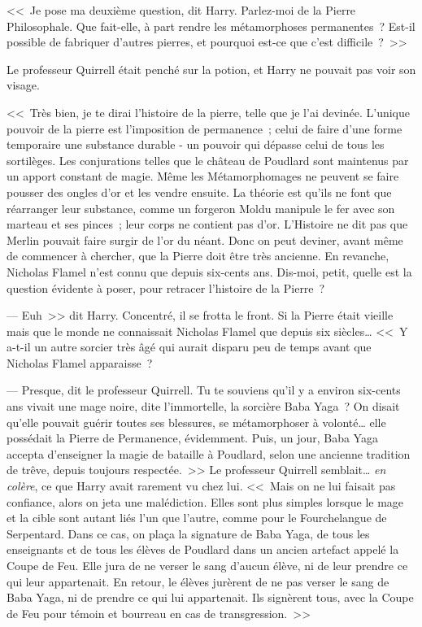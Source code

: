 <<~Je pose ma deuxième question, dit Harry. Parlez-moi de la Pierre Philosophale. Que fait-elle, à part rendre les métamorphoses permanentes~? Est-il possible de fabriquer d'autres pierres, et pourquoi est-ce que c'est difficile~?~>>

Le professeur Quirrell était penché sur la potion, et Harry ne pouvait pas voir son visage.

<<~Très bien, je te dirai l'histoire de la pierre, telle que je l'ai devinée. L'unique pouvoir de la pierre est l'imposition de permanence~; celui de faire d'une forme temporaire une substance durable - un pouvoir qui dépasse celui de tous les sortilèges. Les conjurations telles que le château de Poudlard sont maintenus par un apport constant de magie. Même les Métamorphomages ne peuvent se faire pousser des ongles d'or et les vendre ensuite. La théorie est qu'ils ne font que réarranger leur substance, comme un forgeron Moldu manipule le fer avec son marteau et ses pinces~; leur corps ne contient pas d'or. L'Histoire ne dit pas que Merlin pouvait faire surgir de l'or du néant. Donc on peut deviner, avant même de commencer à chercher, que la Pierre doit être très ancienne. En revanche, Nicholas Flamel n'est connu que depuis six-cents ans. Dis-moi, petit, quelle est la question évidente à poser, pour retracer l'histoire de la Pierre~?

--- Euh~>> dit Harry. Concentré, il se frotta le front. Si la Pierre était vieille mais que le monde ne connaissait Nicholas Flamel que depuis six siècles… <<~Y a-t-il un autre sorcier très âgé qui aurait disparu peu de temps avant que Nicholas Flamel apparaisse~?

--- Presque, dit le professeur Quirrell. Tu te souviens qu'il y a environ six-cents ans vivait une mage noire, dite l'immortelle, la sorcière Baba Yaga~? On disait qu'elle pouvait guérir toutes ses blessures, se métamorphoser à volonté… elle possédait la Pierre de Permanence, évidemment. Puis, un jour, Baba Yaga accepta d'enseigner la magie de bataille à Poudlard, selon une ancienne tradition de trêve, depuis toujours respectée.~>> Le professeur Quirrell semblait… \emph{en colère}, ce que Harry avait rarement vu chez lui. <<~Mais on ne lui faisait pas confiance, alors on jeta une malédiction. Elles sont plus simples lorsque le mage et la cible sont autant liés l'un que l'autre, comme pour le Fourchelangue de Serpentard. Dans ce cas, on plaça la signature de Baba Yaga, de tous les enseignants et de tous les élèves de Poudlard dans un ancien artefact appelé la Coupe de Feu. Elle jura de ne verser le sang d'aucun élève, ni de leur prendre ce qui leur appartenait. En retour, le élèves jurèrent de ne pas verser le sang de Baba Yaga, ni de prendre ce qui lui appartenait. Ils signèrent tous, avec la Coupe de Feu pour témoin et bourreau en cas de transgression.~>>

